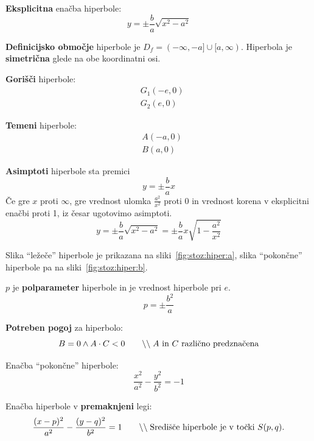\documentclass[a4paper,oneside,12pt,fleqn]{article}
\newcommand\krat\cdot
\newcommand{\comment}[1]{\ensuremath{\qquad\backslash\backslash\;}\textnormal{#1}}
\numberwithin{equation}{section}
\begin{document}
\textbf{Eksplicitna} enačba hiperbole:
\[ y = \pm \frac{b}{a} \sqrt{x^2 - a^2} \]

\textbf{Definicijsko območje} hiperbole je $D_f = (-\infty, -a] \cup [a, \infty)$.
Hiperbola je \textbf{simetrična} glede na obe koordinatni osi.

\textbf{Gorišči} hiperbole:
\begin{align*}
 &G_1(-e, 0) \\
 &G_2(e, 0)
\end{align*}

\textbf{Temeni} hiperbole:
\begin{align*}
  &A(-a, 0) \\
  &B(a, 0)
\end{align*}

\textbf{Asimptoti} hiperbole sta premici
\[ y = \pm \frac{b}{a}x \]
Če gre $x$ proti $\infty$, gre vrednost ulomka $\frac{a^2}{x^2}$ proti 0 in vrednost korena v eksplicitni enačbi proti 1, iz česar
ugotovimo asimptoti.
\[ y = \pm \frac{b}{a} \sqrt{x^2 - a^2}  = \pm \frac{b}{a} x \sqrt{1 -\frac{a^2}{x^2}} \]

Slika ``ležeče'' hiperbole je prikazana na sliki~\ref{fig:stoz:hiper:a}, slika
``pokončne'' hiperbole pa na sliki~\ref{fig:stoz:hiper:b}.

$p$ je \textbf{polparameter} hiperbole in je vrednost hiperbole pri $e$.
\[ p = \pm \frac{b^2}{a} \]

\textbf{Potreben pogoj} za hiperbolo:
\[ B = 0 \land A \krat C < 0 \comment{$A$ in $C$ različno predznačena} \]

Enačba ``pokončne'' hiperbole:
\[ \frac{x^2}{a^2} - \frac{y^2}{b^2} = -1 \]

Enačba hiperbole v \textbf{premaknjeni} legi:
\[ \frac{(x-p)^2}{a^2} - \frac{(y-q)^2}{b^2} = 1 \comment{Središče hiperbole je v točki
$S(p,q)$.} \]
\end{document}
